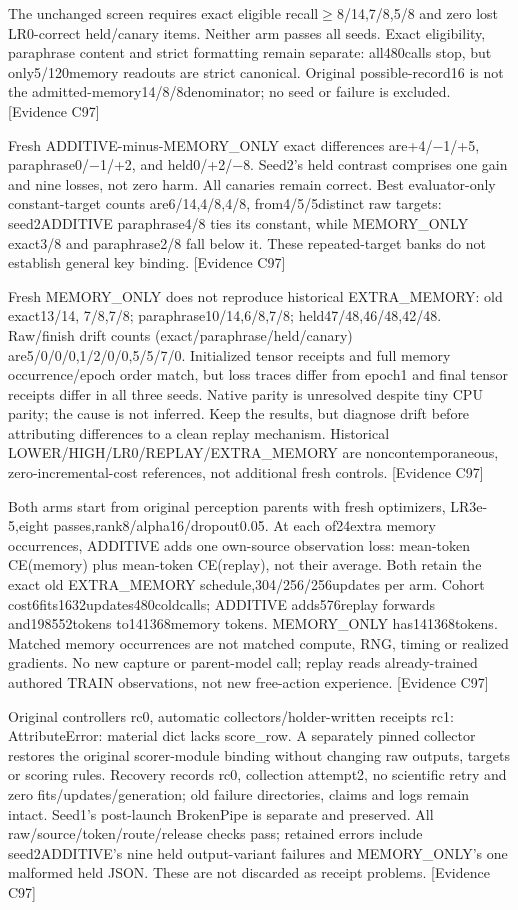 \documentclass[11pt]{article}
\newcommand{\ev}[1]{\textsf{[Evidence #1]}}
\begin{document}
The unchanged screen requires exact eligible recall$\geq$8/14,7/8,5/8 and zero lost
LR0-correct held/canary items. Neither arm passes all seeds. Exact eligibility,
paraphrase content and strict formatting remain separate: all480calls stop, but
only5/120memory readouts are strict canonical. Original possible-record16 is
not the admitted-memory14/8/8denominator; no seed or failure is excluded. \ev{C97}

Fresh ADDITIVE-minus-MEMORY\_ONLY exact differences are+4/$-$1/+5, paraphrase0/$-$1/+2,
and held0/+2/$-$8. Seed2's held contrast comprises one gain and nine losses, not
zero harm. All canaries remain correct. Best evaluator-only constant-target
counts are6/14,4/8,4/8, from4/5/5distinct raw targets: seed2ADDITIVE paraphrase4/8
ties its constant, while MEMORY\_ONLY exact3/8 and paraphrase2/8 fall below it.
These repeated-target banks do not establish general key binding. \ev{C97}

Fresh MEMORY\_ONLY does not reproduce historical EXTRA\_MEMORY: old exact13/14,
7/8,7/8; paraphrase10/14,6/8,7/8; held47/48,46/48,42/48. Raw/finish drift counts
(exact/paraphrase/held/canary) are5/0/0/0,1/2/0/0,5/5/7/0. Initialized tensor
receipts and full memory occurrence/epoch order match, but loss traces differ
from epoch1 and final tensor receipts differ in all three seeds. Native parity
is unresolved despite tiny CPU parity; the cause is not inferred. Keep the
results, but diagnose drift before attributing differences to a clean replay
mechanism. Historical LOWER/HIGH/LR0/REPLAY/EXTRA\_MEMORY are noncontemporaneous,
zero-incremental-cost references, not additional fresh controls. \ev{C97}

Both arms start from original perception parents with fresh optimizers,
LR3e-5,eight passes,rank8/alpha16/dropout0.05. At each of24extra memory occurrences,
ADDITIVE adds one own-source observation loss: mean-token CE(memory) plus
mean-token CE(replay), not their average. Both retain the exact old EXTRA\_MEMORY
schedule,304/256/256updates per arm. Cohort cost6fits1632updates480coldcalls;
ADDITIVE adds576replay forwards and198552tokens to141368memory tokens. MEMORY\_ONLY
has141368tokens. Matched memory occurrences are not matched compute, RNG, timing
or realized gradients. No new capture or parent-model call; replay reads
already-trained authored TRAIN observations, not new free-action experience. \ev{C97}

Original controllers rc0, automatic collectors/holder-written receipts rc1:
AttributeError: material dict lacks score\_row. A separately pinned collector
restores the original scorer-module binding without changing raw outputs,
targets or scoring rules. Recovery records rc0, collection attempt2, no scientific
retry and zero fits/updates/generation; old failure directories, claims and logs
remain intact. Seed1's post-launch BrokenPipe is separate and preserved.
All raw/source/token/route/release checks pass; retained errors include
seed2ADDITIVE's nine held output-variant failures and MEMORY\_ONLY's one malformed
held JSON. These are not discarded as receipt problems. \ev{C97}
\end{document}
